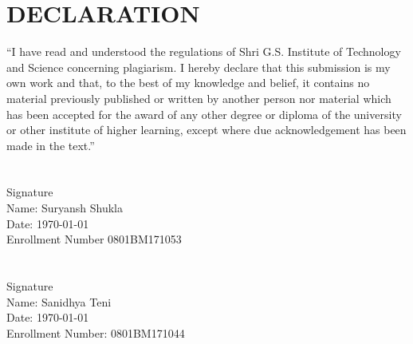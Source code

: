 \chapter*{DECLARATION}
\normalsize
{}

“I have read and understood the regulations of Shri G.S. Institute of Technology and Science concerning plagiarism. I hereby declare that this submission is my own work and that, to the best of my knowledge and belief, it contains no material previously published or written by another person nor material which has been accepted for the award of any other degree or diploma of the university or other institute of higher learning, except where due acknowledgement has been made in the text.”
\\
\\
\\
Signature\\
Name: Suryansh Shukla
\\
Date: \today
\\
Enrollment Number 0801BM171053
\\
\\
\\
Signature\\
Name: Sanidhya Teni
\\
Date: \today
\\
Enrollment Number: 0801BM171044